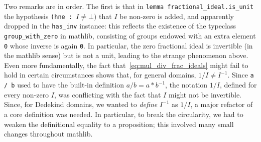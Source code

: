 \documentclass[a4paper,USenglish,cleveref, autoref, thm-restate]{lipics-v2021}
\newcommand{\lean}[1]{\texttt{#1}\xspace} %
\newcommand{\mathlib}{\textsf{mathlib}\xspace}
\begin{document}
Two remarks are in order. The first is that in \lean{lemma fractional\_ideal.is\_unit} the hypothesis \lean{(hne : $I \ne \bot)$} that $I$ be non-zero is added, and apparently dropped in the \lean{has\_inv} instance: this reflects the existence of the typeclass \lean{group\_with\_zero} in \mathlib, consisting of groups endowed with an extra element \lean{0} whose inverse is again \lean{0}. In particular, the zero fractional ideal is invertible (in the \mathlib sense) but is not a unit, leading to the strange phenomenon above. Even more fundamentally, the fact that~\eqref{eq:mul_div_frac_ideals} might fail to hold in certain circumstances shows that, for general domains, $1/I\neq I^{-1}$. Since \lean{a / b} used to have the built-in definition $a / b = a \ast b^{-1}$, the notation $1 / I$, defined for every non-zero $I$, was conflicting with the fact that $I$ might not be invertible. Since, for Dedekind domains, we wanted to \emph{define} $I^{-1}$ as $1 / I$, a major refactor of a core definition was needed. In particular, to break the circularity, we had to weaken the definitional equality to a proposition; this involved many small changes throughout \mathlib.
%
%
%
\end{document}
